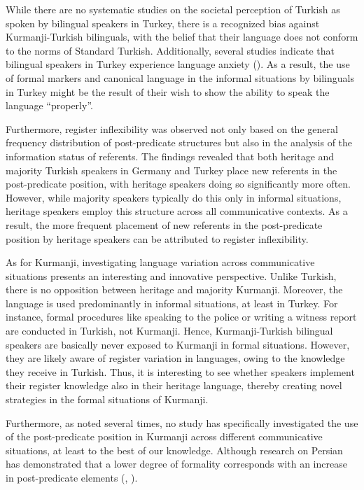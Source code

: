 While there are no systematic studies on the societal perception of Turkish as spoken by bilingual speakers in Turkey, there is a recognized bias against Kurmanji-Turkish bilinguals, with the belief that their language does not conform to the norms of Standard Turkish. Additionally, several studies indicate that bilingual speakers in Turkey experience language anxiety (\citealt{Sahin-firat2010, Tulgar2010}). As a result, the use of formal markers and canonical language in the informal situations by bilinguals in Turkey might be the result of their wish to show the ability to speak the language “properly”.

Furthermore, register inflexibility was observed not only based on the general frequency distribution of post-predicate structures but also in the analysis of the information status of referents. The findings revealed that both heritage and majority Turkish speakers in Germany and Turkey place new referents in the post-predicate position, with heritage speakers doing so significantly more often. However, while majority speakers typically do this only in informal situations, heritage speakers employ this structure across all communicative contexts. As a result, the more frequent placement of new referents in the post-predicate position by heritage speakers can be attributed to register inflexibility.

As for Kurmanji, investigating language variation across communicative situations presents an interesting and innovative perspective. Unlike Turkish, there is no opposition between heritage and majority Kurmanji. Moreover, the language is used predominantly in informal situations, at least in Turkey. For instance, formal procedures like speaking to the police or writing a witness report are conducted in Turkish, not Kurmanji. Hence, Kurmanji-Turkish bilingual speakers are basically never exposed to Kurmanji in formal situations. However, they are likely aware of register variation in languages, owing to the knowledge they receive in Turkish. Thus, it is interesting to see whether speakers implement their register knowledge also in their heritage language, thereby creating novel strategies in the formal situations of Kurmanji.

Furthermore, as noted several times, no study has specifically investigated the use of the post-predicate position in Kurmanji across different communicative situations, at least to the best of our knowledge. Although research on Persian has demonstrated that a lower degree of formality corresponds with an increase in post-predicate elements (\citealt{Frommer1981}, \citealt{Haig_post-predicate_EtAl2024-1}).

